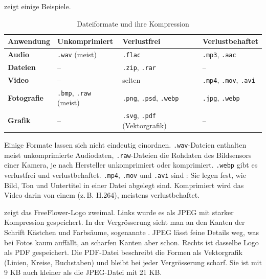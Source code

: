  zeigt einige Beispiele.
\begin{table}[H]
	\centering
	\small
	\begin{tabular}{llll}
		\textbf{Anwendung}  & \textbf{Unkomprimiert}             & \textbf{Verlustfrei}                          & \textbf{Verlustbehaftet}                    \\\midrule
		\textbf{Audio}      & \texttt{.wav} (meist)              & \texttt{.flac}                                & \texttt{.mp3}, \texttt{.aac}                \\
		\textbf{Dateien}    & --                                 & \texttt{.zip}, \texttt{.rar}                  & --                                          \\
		\textbf{Video}      & --                                 & selten                                        & \texttt{.mp4}, \texttt{.mov}, \texttt{.avi} \\
		\textbf{Fotografie} & \texttt{.bmp}, \texttt{.raw} (meist) & \texttt{.png}, \texttt{.psd}, \texttt{.webp} & \texttt{.jpg}, \texttt{.webp}               \\
		\textbf{Grafik}     & --                                 & \texttt{.svg}, \texttt{.pdf} (Vektorgrafik)   & --
	\end{tabular}
	\caption{Dateiformate und ihre Kompression}
	\label{table:dateiformate}
\end{table}
Einige Formate lassen sich nicht eindeutig einordnen. \texttt{.wav}-Dateien enthalten meist unkomprimierte Audiodaten, \texttt{.raw}-Dateien die Rohdaten des Bildsensors einer Kamera, je nach Hersteller unkomprimiert oder komprimiert. \texttt{.webp} gibt es verlustfrei und verlustbehaftet. \texttt{.mp4}, \texttt{.mov} und \texttt{.avi} sind : Sie legen fest, wie Bild, Ton und Untertitel in einer Datei abgelegt sind. Komprimiert wird das Video darin von einem  (z.\,B. H.264), meistens verlustbehaftet.

 zeigt das FreeFlower-Logo zweimal. Links wurde es als JPEG mit starker Kompression gespeichert. In der Vergrösserung sieht man an den Kanten der Schrift Kästchen und Farbsäume, sogenannte . JPEG lässt feine Details weg, was bei Fotos kaum auffällt, an scharfen Kanten aber schon. Rechts ist dasselbe Logo als \gls{PDF} gespeichert. Die \acrshort{PDF}-Datei beschreibt die Formen als Vektorgrafik (Linien, Kreise, Buchstaben) und bleibt bei jeder Vergrösserung scharf. Sie ist mit 9 KB auch kleiner als die JPEG-Datei mit 21 KB.

